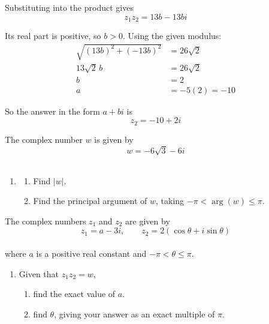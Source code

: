 \documentclass[leqno]{article}
\begin{document}
\begin{enumerate}[
  label=\textbf{\arabic*.},
  leftmargin=*,
  topsep=0pt,
  partopsep=0pt,
  parsep=0pt
]
\begin{djsSolution}
\begin{enumerate}[label=\textbf{(\alph*)}, start=1]
Substituting into the product gives
\[
z_1z_2=13b-13bi
\]

Its real part is positive, so \(b>0\). Using the given modulus:
\begin{align*}
\sqrt{(13b)^2+(-13b)^2}&=26\sqrt{2}\\
13\sqrt{2}\,b&=26\sqrt{2}\\
b&=2\\
a&=-5(2)=-10
\end{align*}

So the answer in the form \(a+bi\) is
\[
z_2=-10+2i
\]

\end{enumerate}
\end{djsSolution}

\newpage

\questionitem

The complex number $w$ is given by
\[
w=-6\sqrt{3}-6i
\] \\
\begin{enumerate}[label=\textbf{(\alph*)}]
\item
\begin{enumerate}[label=(\roman*)]
\item Find $|w|$.  \\
\item Find the principal argument of $w$, taking $-\pi<\arg(w)\leq\pi$.  \\
\end{enumerate}
\end{enumerate}
The complex numbers $z_1$ and $z_2$ are given by
\[
z_1=a-3i,\qquad z_2=2(\cos\theta+i\sin\theta)
\] \\
where $a$ is a positive real constant and $-\pi<\theta\leq\pi$. \\
\begin{enumerate}[label=\textbf{(\alph*)}, resume]
\item Given that $z_1z_2=w$, \\
\begin{enumerate}[label=(\roman*)]
\item find the exact value of $a$.  \\
\item find $\theta$, giving your answer as an exact multiple of $\pi$.  \\
\end{enumerate}
\end{enumerate}


\end{enumerate}
\end{document}
